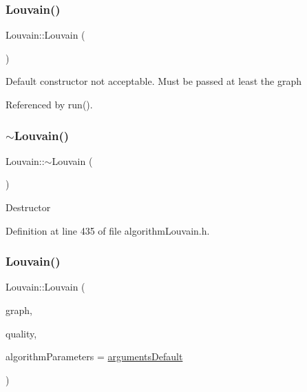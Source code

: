 \subsubsection{\texorpdfstring{Louvain()}{Louvain()}\hspace{0.1cm}{\footnotesize\ttfamily [1/2]}}
{\footnotesize\ttfamily Louvain\+::\+Louvain (\begin{DoxyParamCaption}{ }\end{DoxyParamCaption})\hspace{0.3cm}{\ttfamily [delete]}}

Default constructor not acceptable. Must be passed at least the graph 

Referenced by run().

\mbox{\label{classLouvain_ab1e0249e6af438c5c3e133bf68302607}} 
\subsubsection{\texorpdfstring{$\sim$\+Louvain()}{~Louvain()}}
{\footnotesize\ttfamily Louvain\+::$\sim$\+Louvain (\begin{DoxyParamCaption}{ }\end{DoxyParamCaption})\hspace{0.3cm}{\ttfamily [inline]}}

Destructor 

Definition at line 435 of file algorithm\+Louvain.\+h.

\mbox{\label{classLouvain_af231d4b9a0cc645d74edffdf6e6445ff}} 
\subsubsection{\texorpdfstring{Louvain()}{Louvain()}\hspace{0.1cm}{\footnotesize\ttfamily [2/2]}}
{\footnotesize\ttfamily Louvain\+::\+Louvain (\begin{DoxyParamCaption}\item[{\hyperlink{classGraphUndirectedGroupable}{Graph\+Undirected\+Groupable} \&}]{graph,  }\item[{\hyperlink{classQuality}{Quality} \&}]{quality,  }\item[{\hyperlink{structProgramParameters}{Program\+Parameters} \&}]{algorithm\+Parameters = {\ttfamily \hyperlink{program_8h_ae2d819404495f80f31db7676c1329d19}{arguments\+Default}} }\end{DoxyParamCaption})\hspace{0.3cm}{\ttfamily [inline]}}

